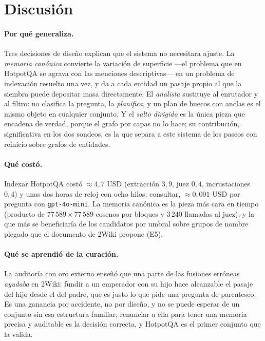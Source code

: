 \documentclass[11pt,a4paper]{article}
\begin{document}
\section{Discusión}
\label{sec:discusion}

\paragraph{Por qué generaliza.}
Tres decisiones de diseño explican que el sistema no necesitara ajuste. La
\emph{memoria canónica} convierte la variación de superficie ---el problema
que en HotpotQA se agrava con las menciones descriptivas--- en un problema
de indexación resuelto una vez, y da a cada entidad un pasaje propio al que
la siembra puede depositar masa directamente. El \emph{analista} sustituye
al enrutador y al filtro: no clasifica la pregunta, la \emph{planifica}, y
un plan de huecos con anclas es el mismo objeto en cualquier conjunto. Y el
\emph{salto dirigido} es la única pieza que encadena de verdad, porque el
grafo por capas no lo hace; su contribución, significativa en los dos
sondeos, es la que separa a este sistema de los paseos con reinicio sobre
grafos de entidades.

\paragraph{Qué costó.}
Indexar HotpotQA costó $\approx 4{,}7$ USD (extracción $3{,}9$, juez $0{,}4$,
incrustaciones $0{,}4$) y unas dos horas de reloj con ocho hilos; consultar,
$\approx 0{,}001$ USD por pregunta con \texttt{gpt-4o-mini}. La memoria
canónica es la pieza más cara en tiempo (producto de $77\,589 \times 77\,589$
cosenos por bloques y $3\,240$ llamadas al juez), y la que más se
beneficiaría de los candidatos por umbral sobre grupos de nombre plegado
que el documento de 2Wiki propone (E5).

\paragraph{Qué se aprendió de la curación.}
La auditoría con oro externo enseñó que una parte de las fusiones erróneas
\emph{ayudaba} en 2Wiki: fundir a un emperador con su hijo hace alcanzable
el pasaje del hijo desde el del padre, que es justo lo que pide una pregunta
de parentesco. Es una ganancia por accidente, no por diseño, y no se puede
esperar de un conjunto sin esa estructura familiar; renunciar a ella para
tener una memoria precisa y auditable es la decisión correcta, y HotpotQA
es el primer conjunto que la valida.
\end{document}
